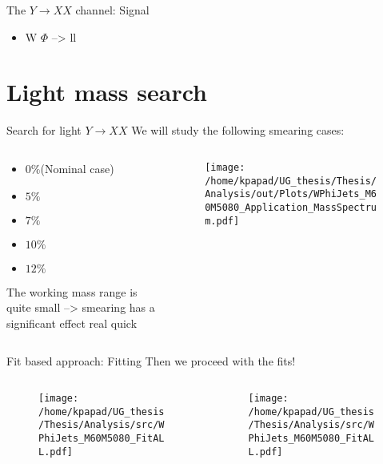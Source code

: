 \documentclass[bigger]{beamer}
\begin{document}
\begin{frame}[label={sec:orgf1dca4b}]{The \(Y \rightarrow XX\) channel: Signal}
\begin{itemize}
\item W \(\Phi\) --> ll
\end{itemize}
\end{frame}

\section{Light mass search}
\label{sec:org118cd51}
\begin{frame}[label={sec:org3537510}]{Search for light \(Y \rightarrow XX\)}
We will study the following smearing cases:
\begin{columns}
\begin{column}{0.5\columnwidth}
\begin{itemize}
\item \(0\%\)(Nominal case)
\item \(5\%\)
\item \(7\%\)
\item \(10\%\)
\item \(12\%\)
\end{itemize}
The working mass range is quite small --> smearing has a significant effect real quick 
\end{column}
\begin{column}{0.5\columnwidth}
\begin{figure}[h]
\centering
\texttt{[image: /home/kpapad/UG\_thesis/Thesis/Analysis/out/Plots/WPhiJets\_M60M5080\_Application\_MassSpectrum.pdf]}
\end{figure}
\end{column}
\end{columns}
\end{frame}
\begin{frame}[label={sec:org91594c6}]{Fit based approach: Fitting}
Then we proceed with the fits!
\begin{columns}
\begin{column}{0.5\columnwidth}
\begin{figure}[h]
\centering
\texttt{[image: /home/kpapad/UG\_thesis/Thesis/Analysis/src/WPhiJets\_M60M5080\_FitALL.pdf]}
\end{figure}
\end{column}

\begin{column}{0.5\columnwidth}
\begin{figure}[h]
\centering
\texttt{[image: /home/kpapad/UG\_thesis/Thesis/Analysis/src/WPhiJets\_M60M5080\_FitALL.pdf]}
\end{figure}
\end{column}
\end{columns}
\end{frame}
\end{document}
